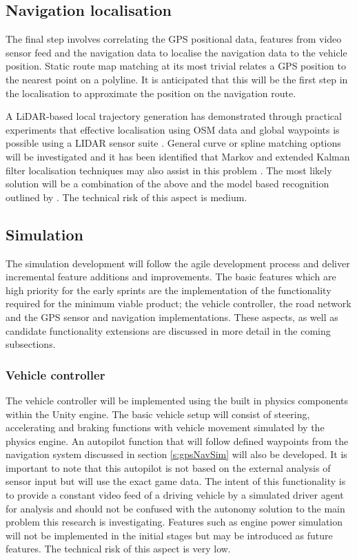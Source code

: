 \documentclass[]{aiaa-tc}%
\begin{document}
\subsection{Navigation localisation}

The final step involves correlating the GPS positional data, features from video sensor feed and the navigation data to localise the navigation data to the vehicle position. Static route map matching at its most trivial relates a GPS position to the nearest point on a polyline. It is anticipated that this will be the first step in the localisation to approximate the position on the navigation route. 

A LiDAR-based local trajectory generation has demonstrated through practical experiments that effective localisation using OSM data and global waypoints is possible using a LIDAR sensor suite \cite{mitLocalNavDriving}. General curve or spline matching options will be investigated and it has been identified that Markov and extended Kalman filter localisation techniques may also assist in this problem \citep{probabalisticRobotics}. The most likely solution will be a combination of the above and the model based recognition outlined by \citet{modelBasedIntersection}. The technical risk of this aspect is medium.

\subsection{Simulation}

The simulation development will follow the agile development process and deliver incremental feature additions and improvements. The basic features which are high priority for the early sprints are the implementation of the functionality required for the minimum viable product; the vehicle controller, the road network and the GPS sensor and navigation implementations. These aspects, as well as candidate functionality extensions are discussed in more detail in the coming subsections.

\subsubsection{Vehicle controller}

The vehicle controller will be implemented using the built in physics components within the Unity engine. The basic vehicle setup will consist of steering, accelerating and braking functions with vehicle movement simulated by the physics engine. An autopilot function that will follow defined waypoints from the navigation system discussed in section \ref{s:gpsNavSim} will also be developed. It is important to note that this autopilot is not based on the external analysis of sensor input but will use the exact game data. The intent of this functionality is to provide a constant video feed of a driving vehicle by a simulated driver agent for analysis and should not be confused with the autonomy solution to the main problem this research is investigating. Features such as engine power simulation will not be implemented in the initial stages but may be introduced as future features. The technical risk of this aspect is very low.
\end{document}
